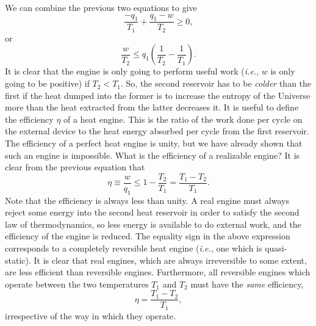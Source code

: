 We can combine the previous two equations to give
\begin{equation}
\frac{-q_1}{T_1} + \frac{q_1 - w}{T_2} \geq 0,
\end{equation}
or
\begin{equation}
\frac{w}{T_2} \leq q_1\left(\frac{1}{T_2} - \frac{1}{T_1}\right).
\end{equation}
It is clear that the engine is only going to perform useful work ({\em i.e.}, $w$ is
 only going to be positive) if $T_2 < T_1$. So, the second reservoir has to be {\em colder}\/ than
the first  if the heat dumped into the former is to increase the
entropy of the Universe more than
the heat extracted from the latter decreases it. It is useful to define the
efficiency $\eta$ of a heat engine. This is the ratio of the work done per cycle
on the external device to
the heat energy absorbed per cycle from the first reservoir. The efficiency of a
perfect heat engine is unity, but we have already shown that such an engine
is impossible. What is the efficiency of a realizable engine? It is clear
from the previous equation that
\begin{equation}
\eta \equiv \frac{w}{q_1} \leq 1 - \frac{T_2} {T_1} = \frac{T_1 - T_2}{T_1}.
\label{e6.91}
\end{equation}
Note that the efficiency is always less than unity. A real engine must always
reject some energy into the second heat reservoir in order to satisfy the second
law of thermodynamics, so less energy is available to do external
work, and the efficiency
of the engine is reduced. The equality sign in the above expression corresponds
to a completely reversible heat engine ({\em i.e.}, one which is quasi-static). It
is
clear that real engines, which are always irreversible to some extent, are
less efficient than reversible engines. Furthermore, all reversible engines
which operate between the two temperatures $T_1$ and $T_2$ must have the
{\em same}\/ efficiency,
\begin{equation}
\eta = \frac{T_1 - T_2}{T_1},\label{e6.92}
\end{equation}
irrespective of the way in which they operate. 

